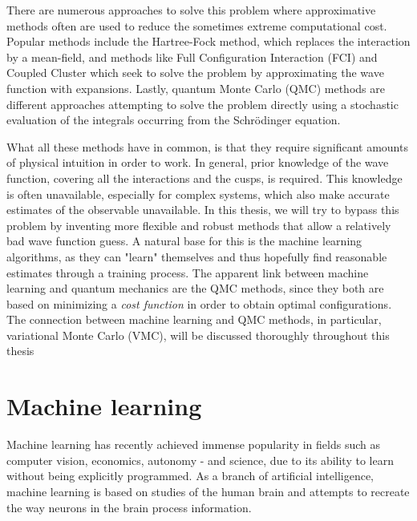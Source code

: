 There are numerous approaches to solve this problem where approximative methods often are used to reduce the sometimes extreme computational cost. Popular methods include the Hartree-Fock method, which replaces the interaction by a mean-field, and methods like Full Configuration Interaction (FCI) and Coupled Cluster which seek to solve the problem by approximating the wave function with expansions. Lastly, quantum Monte Carlo (QMC) methods are different approaches attempting to solve the problem directly using a stochastic evaluation of the integrals occurring from the Schrödinger equation. 

What all these methods have in common, is that they require significant amounts of physical intuition in order to work. In general, prior knowledge of the wave function, covering all the interactions and the cusps, is required. This knowledge is often unavailable, especially for complex systems, which also make accurate estimates of the observable unavailable. In this thesis, we will try to bypass this problem by inventing more flexible and robust methods that allow a relatively bad wave function guess. A natural base for this is the machine learning algorithms, as they can "learn" themselves and thus hopefully find reasonable estimates through a training process. The apparent link between machine learning and quantum mechanics are the QMC methods, since they both are based on minimizing a \textit{cost function} in order to obtain optimal configurations. The connection between machine learning and QMC methods, in particular, variational Monte Carlo (VMC), will be discussed thoroughly throughout this thesis

\section{Machine learning} \label{sec:machinelearning}
Machine learning has recently achieved immense popularity in fields such as computer vision, economics, autonomy - and science, due to its ability to learn without being explicitly programmed. As a branch of artificial intelligence, machine learning is based on studies of the human brain and attempts to recreate the way neurons in the brain process information. 

